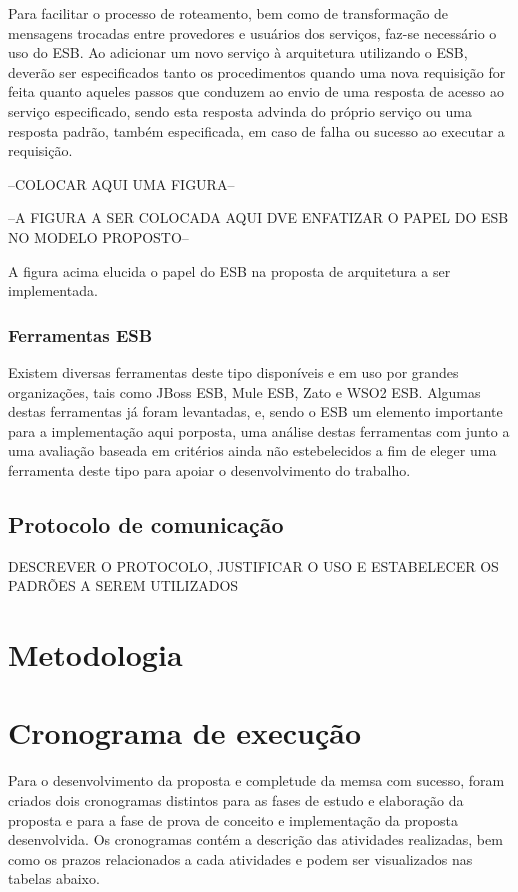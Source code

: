 Para facilitar o processo de roteamento, bem como de transformação de mensagens trocadas entre provedores e usuários dos serviços, faz-se necessário o uso do ESB. Ao adicionar um novo serviço à arquitetura utilizando o ESB, deverão ser especificados tanto os procedimentos quando uma nova requisição for feita quanto aqueles passos que conduzem ao envio de uma resposta de acesso ao serviço especificado, sendo esta resposta advinda do próprio serviço ou uma resposta padrão, também especificada, em caso de falha ou sucesso ao executar a requisição.

--COLOCAR AQUI UMA FIGURA--

--A FIGURA A SER COLOCADA AQUI DVE ENFATIZAR O PAPEL DO ESB NO MODELO PROPOSTO--

A figura acima elucida o papel do ESB na proposta de arquitetura a ser implementada.

\subsubsection{Ferramentas ESB}
Existem diversas ferramentas deste tipo disponíveis e em uso por grandes organizações, tais como JBoss ESB, Mule ESB, Zato e WSO2 ESB. Algumas destas ferramentas já foram levantadas, e, sendo o ESB um elemento importante para a implementação aqui porposta, uma análise destas ferramentas com junto a uma avaliação baseada em critérios ainda não estebelecidos a fim de eleger uma ferramenta deste tipo para apoiar o desenvolvimento do trabalho.

\subsection{Protocolo de comunicação}

{DESCREVER O PROTOCOLO, JUSTIFICAR O USO E ESTABELECER OS PADRÕES A SEREM UTILIZADOS}

\section{Metodologia}


\section{Cronograma de execução}
Para o desenvolvimento da proposta e completude da memsa com sucesso, foram criados dois cronogramas distintos para as fases de estudo e elaboração da proposta e para a fase de prova de conceito e implementação da proposta desenvolvida. Os cronogramas contém a descrição das atividades realizadas, bem como os prazos relacionados a cada atividades e podem ser visualizados nas tabelas abaixo.

